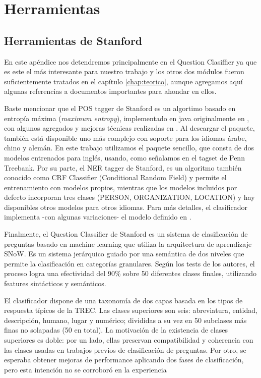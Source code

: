\appendix
\chapter{Herramientas}
\label{chap:herramientas}

\section{Herramientas de Stanford}
\label{sec:stanford-tools}

En este apéndice nos detendremos principalmente en el Question Clasiffier ya que es este el más interesante para nuestro trabajo y los otros dos módulos fueron suficientemente tratados en el capítulo \ref{chap:teorico}, aunque agregamos aquí algunas referencias a documentos importantes para ahondar en ellos.

Baste mencionar que el POS tagger de Stanford es un algortimo basado en entropía máxima (\textit{maximum entropy}), implementado en java originalmente en \cite{POS2}, con algunos agregados y mejoras técnicas realizadas en \cite{POS1}. Al descargar el paquete, también está disponible uno más complejo con soporte para los idiomas árabe, chino y alemán. En este trabajo utilizamos el paquete sencillo, que consta de dos modelos entrenados para inglés, usando, como señalamos en  el tagset de Penn Treebank. Por su parte, el NER tagger de Stanford, es un algoritmo también conocido como CRF Classifier (Conditional Random Field) y permite el entrenamiento con modelos propios, mientras que los modelos incluidos por defecto incorporan tres clases (PERSON, ORGANIZATION, LOCATION) y hay disponibles otros modelos para otros idiomas. Para más detalles, el clasificador implementa -con algunas variaciones- el modelo definido en \cite{NER2}.

Finalmente, el Question Classifier de Stanford \cite{QC2} es un sistema de clasificación de preguntas basado en machine learning que utiliza la arquitectura de aprendizaje SNoW. Es un sistema jerárquico guiado por una semántica de dos niveles que permite la clasificación en categorías granulares. Según los tests de los autores, el proceso logra una efectividad del 90\% sobre 50 diferentes clases finales, utilizando features sintácticos y semánticos.

El clasificador dispone de una taxonomía de dos capas basada en los tipos de respuesta típicos de la TREC. Las clases superiores son seis: abreviatura, entidad, descripción, humano, lugar y numérico; divididas a su vez en 50 subclases más finas no solapadas (50 en total). La motivación de la existencia de clases superiores es doble: por un lado, ellas preservan compatibilidad y coherencia con las clases usadas en trabajos previos de clasificación de preguntas. Por otro, se esperaba obtener mejoras de performance aplicando dos fases de clasificación, pero esta intención no se corroboró en la experiencia

